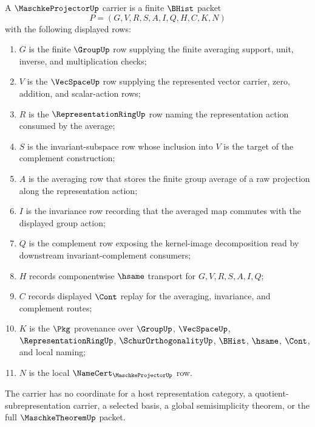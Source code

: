 \begin{definition}
\label{def:maschke-projector-carrier}
A $\MaschkeProjectorUp$ carrier is a finite $\BHist$ packet
$$
P=(G,V,R,S,A,I,Q,H,C,K,N)
$$
with the following displayed rows:
\begin{enumerate}
\item $G$ is the finite $\GroupUp$ row supplying the finite averaging support, unit, inverse, and multiplication checks;
\item $V$ is the $\VecSpaceUp$ row supplying the represented vector carrier, zero, addition, and scalar-action rows;
\item $R$ is the $\RepresentationRingUp$ row naming the representation action consumed by the average;
\item $S$ is the invariant-subspace row whose inclusion into $V$ is the target of the complement construction;
\item $A$ is the averaging row that stores the finite group average of a raw projection along the representation action;
\item $I$ is the invariance row recording that the averaged map commutes with the displayed group action;
\item $Q$ is the complement row exposing the kernel-image decomposition read by downstream invariant-complement consumers;
\item $H$ records componentwise $\hsame$ transport for $G,V,R,S,A,I,Q$;
\item $C$ records displayed $\Cont$ replay for the averaging, invariance, and complement routes;
\item $K$ is the $\Pkg$ provenance over $\GroupUp$, $\VecSpaceUp$, $\RepresentationRingUp$, $\SchurOrthogonalityUp$, $\BHist$, $\hsame$, $\Cont$, and local naming;
\item $N$ is the local $\NameCert_{\MaschkeProjectorUp}$ row.
\end{enumerate}
The carrier has no coordinate for a host representation category, a quotient-subrepresentation carrier, a selected basis, a global semisimplicity theorem, or the full $\MaschkeTheoremUp$ packet.
\end{definition}


